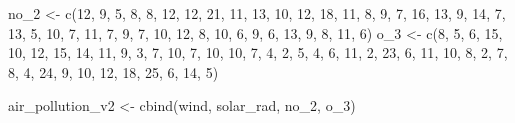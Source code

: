 \documentclass[
]{article}
\newenvironment{Shaded}{\begin{snugshade}}{\end{snugshade}}
\newcommand{\DecValTok}[1]{\textcolor[rgb]{0.00,0.00,0.81}{#1}}
\newcommand{\FunctionTok}[1]{\textcolor[rgb]{0.00,0.00,0.00}{#1}}
\newcommand{\NormalTok}[1]{#1}
\newcommand{\OtherTok}[1]{\textcolor[rgb]{0.56,0.35,0.01}{#1}}
\begin{document}
\begin{Shaded}
\begin{Highlighting}[]
\NormalTok{no\_2 }\OtherTok{\textless{}{-}} \FunctionTok{c}\NormalTok{(}\DecValTok{12}\NormalTok{, }\DecValTok{9}\NormalTok{, }\DecValTok{5}\NormalTok{, }\DecValTok{8}\NormalTok{, }\DecValTok{8}\NormalTok{, }\DecValTok{12}\NormalTok{, }\DecValTok{12}\NormalTok{, }\DecValTok{21}\NormalTok{, }\DecValTok{11}\NormalTok{, }\DecValTok{13}\NormalTok{, }\DecValTok{10}\NormalTok{, }\DecValTok{12}\NormalTok{, }\DecValTok{18}\NormalTok{, }\DecValTok{11}\NormalTok{, }\DecValTok{8}\NormalTok{, }\DecValTok{9}\NormalTok{, }\DecValTok{7}\NormalTok{, }\DecValTok{16}\NormalTok{, }\DecValTok{13}\NormalTok{, }\DecValTok{9}\NormalTok{, }\DecValTok{14}\NormalTok{, }\DecValTok{7}\NormalTok{, }\DecValTok{13}\NormalTok{, }\DecValTok{5}\NormalTok{, }\DecValTok{10}\NormalTok{, }\DecValTok{7}\NormalTok{, }\DecValTok{11}\NormalTok{, }\DecValTok{7}\NormalTok{, }\DecValTok{9}\NormalTok{, }\DecValTok{7}\NormalTok{, }\DecValTok{10}\NormalTok{, }\DecValTok{12}\NormalTok{, }\DecValTok{8}\NormalTok{, }\DecValTok{10}\NormalTok{, }\DecValTok{6}\NormalTok{, }\DecValTok{9}\NormalTok{, }\DecValTok{6}\NormalTok{, }\DecValTok{13}\NormalTok{, }\DecValTok{9}\NormalTok{, }\DecValTok{8}\NormalTok{, }\DecValTok{11}\NormalTok{, }\DecValTok{6}\NormalTok{)}
\NormalTok{o\_3 }\OtherTok{\textless{}{-}} \FunctionTok{c}\NormalTok{(}\DecValTok{8}\NormalTok{, }\DecValTok{5}\NormalTok{, }\DecValTok{6}\NormalTok{, }\DecValTok{15}\NormalTok{, }\DecValTok{10}\NormalTok{, }\DecValTok{12}\NormalTok{, }\DecValTok{15}\NormalTok{, }\DecValTok{14}\NormalTok{, }\DecValTok{11}\NormalTok{, }\DecValTok{9}\NormalTok{, }\DecValTok{3}\NormalTok{, }\DecValTok{7}\NormalTok{, }\DecValTok{10}\NormalTok{, }\DecValTok{7}\NormalTok{, }\DecValTok{10}\NormalTok{, }\DecValTok{10}\NormalTok{, }\DecValTok{7}\NormalTok{, }\DecValTok{4}\NormalTok{, }\DecValTok{2}\NormalTok{, }\DecValTok{5}\NormalTok{, }\DecValTok{4}\NormalTok{, }\DecValTok{6}\NormalTok{, }\DecValTok{11}\NormalTok{, }\DecValTok{2}\NormalTok{, }\DecValTok{23}\NormalTok{, }\DecValTok{6}\NormalTok{, }\DecValTok{11}\NormalTok{, }\DecValTok{10}\NormalTok{, }\DecValTok{8}\NormalTok{, }\DecValTok{2}\NormalTok{, }\DecValTok{7}\NormalTok{, }\DecValTok{8}\NormalTok{, }\DecValTok{4}\NormalTok{, }\DecValTok{24}\NormalTok{, }\DecValTok{9}\NormalTok{, }\DecValTok{10}\NormalTok{, }\DecValTok{12}\NormalTok{, }\DecValTok{18}\NormalTok{, }\DecValTok{25}\NormalTok{, }\DecValTok{6}\NormalTok{, }\DecValTok{14}\NormalTok{, }\DecValTok{5}\NormalTok{)}

\NormalTok{air\_pollution\_v2 }\OtherTok{\textless{}{-}} \FunctionTok{cbind}\NormalTok{(wind, solar\_rad, no\_2, o\_3)}
\end{Highlighting}
\end{Shaded}
\end{document}
